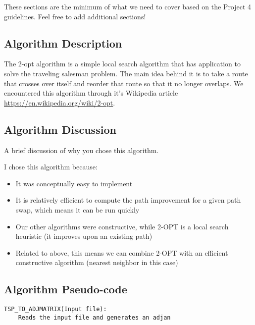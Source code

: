 \documentclass[../report/main.tex]{subfiles}
\begin{document}
These sections are the minimum of what we need to cover based on the Project 4 guidelines. Feel free to add additional sections!

\subsection*{Algorithm Description}

The 2-opt algorithm is a simple local search algorithm that has application to solve the traveling salesman problem. The main idea behind it is to take a route that crosses over itself and reorder that route so that it no longer overlaps. We encountered this algorithm through it's Wikipedia article \url{https://en.wikipedia.org/wiki/2-opt}.

\subsection*{Algorithm Discussion}

A brief discussion of why you chose this algorithm.

I chose this algorithm because:
\begin{itemize}
	\item It was conceptually easy to implement
	\item It is relatively efficient to compute the path improvement for a given path swap, which means it can be run quickly
	\item Our other algorithms were constructive, while 2-OPT is a local search heuristic (it improves upon an existing path)
	\item Related to above, this means we can combine 2-OPT with an efficient constructive algorithm (nearest neighbor in this case)
\end{itemize}

\subsection*{Algorithm Pseudo-code}

\begin{verbatim}
TSP_TO_ADJMATRIX(Input file):
    Reads the input file and generates an adjan
\end{verbatim}
\end{document}
